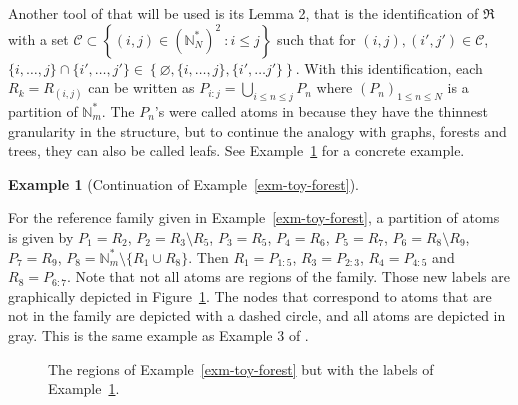 \documentclass[
  11pt,
  a4paper,
]{article}
\theoremstyle{definition}
\newtheorem{example}{Example}[section]
\theoremstyle{plain}
\theoremstyle{plain}
\theoremstyle{plain}
\theoremstyle{definition}
\theoremstyle{remark}
\begin{document}
Another tool of \citet{MR4178188} that will be used is its Lemma 2, that
is the identification of \(\mathfrak{R}\) with a set
\(\mathcal C\subset \left\{(i,j)\in \left(\mathbb N_N^*\right)^2 \: : i\leq j\right\}\)
such that for \((i,j), (i',j')\in\mathcal C\),
\(\{i,\dotsc, j\}\cap\{i',\dotsc,j'\}\in\left\{\varnothing, \{i,\dotsc, j\},\{i',\dotsc j'\}  \right\}\).
With this identification, each \(R_k=R_{(i,j)}\) can be written as
\(P_{i:j}=\bigcup_{i\leq n\leq j}P_n\) where \((P_n)_{1\leq n \leq N}\)
is a partition of \(\mathbb{N}_m^*\). The \(P_n\)'s were called atoms in
\citet{MR4178188} because they have the thinnest granularity in the
structure, but to continue the analogy with graphs, forests and trees,
they can also be called leafs. See Example~\ref{exm-toy-leaves} for a
concrete example.

\begin{example}[Continuation of
Example~\ref{exm-toy-forest}]\protect\hypertarget{exm-toy-leaves}{}\label{exm-toy-leaves}

For the reference family given in Example~\ref{exm-toy-forest}, a
partition of atoms is given by \(P_1 =R_2\),
\(P_2  =   R_3\setminus R_5\), \(P_3  =   R_5\), \(P_4=R_6\),
\(P_5=R_7\), \(P_6=R_8\setminus R_9\), \(P_7=R_9\),
\(P_8=\mathbb{N}_m^* \setminus \{R_1 \cup R_8 \}\). Then
\(R_1=P_{1:5}\), \(R_3=P_{2:3}\), \(R_4=P_{4:5}\) and \(R_8=P_{6:7}\).
Note that not all atoms are regions of the family. Those new labels are
graphically depicted in Figure~\ref{fig-leaves-exm}. The nodes that
correspond to atoms that are not in the family are depicted with a
dashed circle, and all atoms are depicted in gray. This is the same
example as Example 3 of \citet{MR4178188}.

\end{example}

\begin{figure}


\caption{\label{fig-leaves-exm}The regions of
Example~\ref{exm-toy-forest} but with the labels of
Example~\ref{exm-toy-leaves}.}

\end{figure}%
\end{document}
